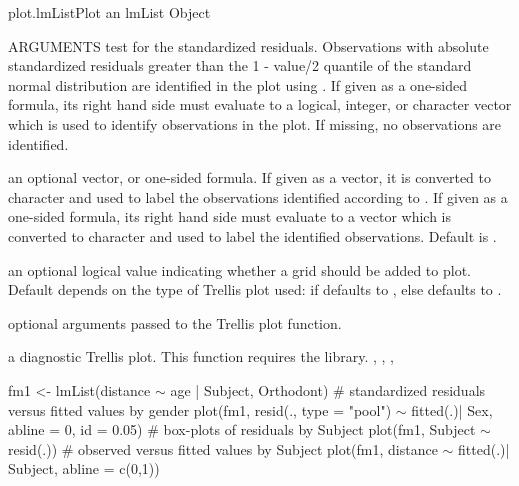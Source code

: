 \documentclass[pdftex]{article} \usepackage{url,graphicx}
\renewcommand{\Twiddle}{\mbox{\(\sim\)}}
\begin{document}
\begin{Helpfile}{plot.lmList}{Plot an lmList Object}
\begin{Argument}{ARGUMENTS}
test for the standardized residuals. Observations with
absolute standardized residuals greater than the 1 - value/2
quantile of the standard normal distribution are identified in the
plot using . If given as a one-sided formula, its
right hand side must evaluate to a  logical, integer, or character
vector which is used to identify observations in the plot. If
missing, no observations are identified.
\item[\Co{idLabels:}]
an optional vector, or one-sided formula. If given as a
vector, it is converted to character and used to label the
observations identified according to . If given as a
one-sided formula, its right hand side must evaluate to a vector
which is converted to character and used to label the identified
observations. Default is . 
\item[\Co{grid:}]
an optional logical value indicating whether a grid should
be added to plot. Default depends on the type of Trellis plot used:
if  defaults to , else defaults to
.
\item[\Co{...:}]
optional arguments passed to the Trellis plot function.
\end{Argument}
a diagnostic Trellis plot.
 This function requires the  library.
, , ,
\need 15pt
\vspace{-16pt}
\begin{Example}
fm1 <- lmList(distance {\Twiddle} age | Subject, Orthodont)
# standardized residuals versus fitted values by gender
plot(fm1, resid(., type = "pool") {\Twiddle} fitted(.)| Sex, 
     abline = 0, id = 0.05)
# box-plots of residuals by Subject
plot(fm1, Subject {\Twiddle} resid(.))
# observed versus fitted values by Subject
plot(fm1, distance {\Twiddle} fitted(.)| Subject, abline = c(0,1))
\end{Example}
\end{Helpfile}
\end{document}

